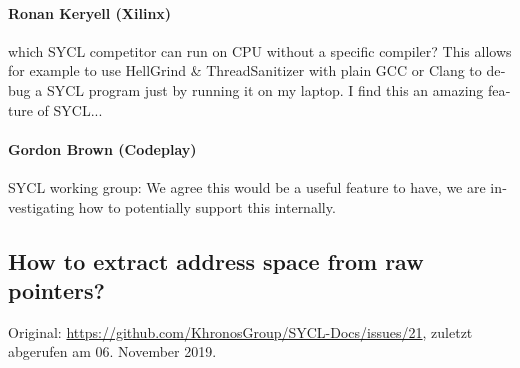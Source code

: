 \begin{otherlanguage}{english}
    \paragraph{Ronan Keryell (Xilinx)} which SYCL competitor can run on CPU
                              without a specific compiler? This allows for
                              example to use HellGrind \& ThreadSanitizer with
                              plain GCC or Clang to debug a SYCL program just by
                              running it on my laptop. I find this an amazing
                              feature of SYCL...
    \paragraph{Gordon Brown (Codeplay)} SYCL working group: We agree this would
                                        be a useful feature to have, we are
                                        investigating how to potentially support
                                        this internally.
\end{otherlanguage}

\newpage
\subsection{How to extract address space from raw pointers?}
\label{anhang:diskussionen:syclspec:addressspace}

Original: \url{https://github.com/KhronosGroup/SYCL-Docs/issues/21}, zuletzt
abgerufen am 06. November 2019.

